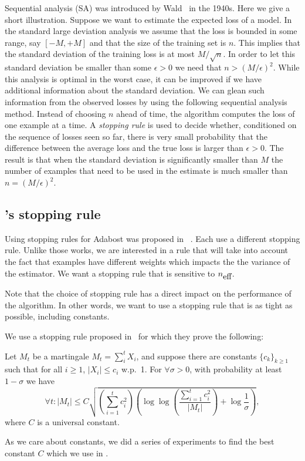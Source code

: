 Sequential analysis (SA) was introduced by
Wald~\cite{wald_sequential_1973} in the 1940s.  Here we give a short
illustration. Suppose we want to estimate the expected loss of a
model. In the standard large deviation analysis we assume that the
loss is bounded in some range, say $[-M,+M]$ and that the size of the
training set is $n$. This implies that the standard deviation of the
training loss is at most $M/\sqrt{n}$. In order to let this standard
deviation be smaller than some $\epsilon>0$ we need that $n >
(M/\epsilon)^2$. While this analysis is optimal in the worst case, it
can be improved if we have additional information about the standard
deviation. We can glean such information from the observed losses by
using the following sequential analysis method. Instead of choosing
$n$ ahead of time, the algorithm computes the loss of one example at a
time. A {\em stopping rule} is used to decide whether, conditioned on
the sequence of losses seen so far, there is very small probability
that the difference between the average loss and the true loss is
larger than $\epsilon>0$. The result is that when the standard
deviation is significantly smaller than $M$ the number of examples
that need to be used in the estimate is much smaller than
$n=(M/\epsilon)^2$.

\subsection{\Sparrow's stopping rule} \label{sec:balsubramani}

Using stopping rules for Adabost was proposed in
~\cite{domingo_scaling_2000,bradley_filterboost:_2007}. Each use a
different stopping rule. Unlike those works, we are interested in a
rule that will take into account the fact that examples have different
weights which impacts the the variance of the estimator. We want a
stopping rule that is sensitive to ${n_{\mbox{eff}}}$.

Note that the choice of stopping rule has a direct impact on the
performance of the algorithm. In other words, we want to use a
stopping rule that is as tight as possible, including constants.

We use a stopping rule proposed in~\cite{balsubramani_sharp_2014}
for which they prove the following:

\begin{theorem} \label{thm:balsubramani}
  Let $M_t$ be a martingale $M_t = \sum_i^t X_i$,
  and suppose there are constants $\{c_k\}_{k \geq 1}$ such that
  for all $i \geq 1$, $|X_i| \leq c_i$ w.p.\ 1.
  For $\forall \sigma > 0$, with probability at least $1 - \sigma$ we have
  \[
  \forall t: |M_t| \leq C \sqrt{
    \left( \sum_{i=1}^t c_i^2 \right)
    \left( \log \log \left( \frac{ \sum_{i=1}^t c_i^2 }{ |M_t| }\right) +
    \log \frac{1}{\sigma} \right)
  },
  \]
  where $C$ is a universal constant.
\end{theorem}

As we care about constants, we did a series of experiments to find the
best constant $C$ which we use in \Sparrow.
